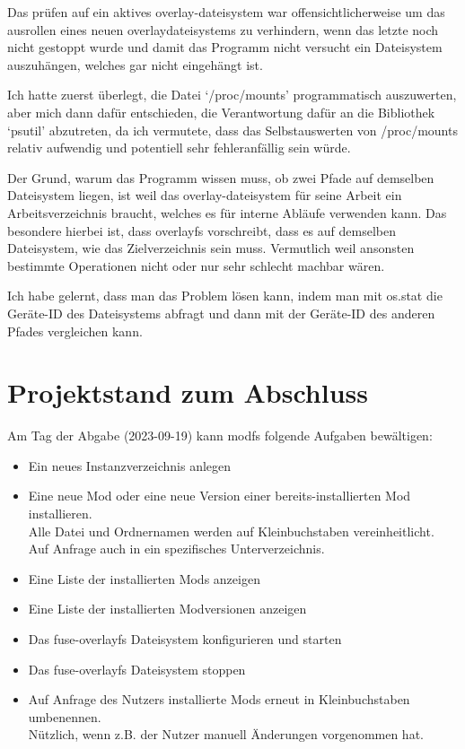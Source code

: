 \documentclass[a4paper,numbers=withenddot,11pt]{scrartcl}
\begin{document}
Das prüfen auf ein aktives overlay-dateisystem war offensichtlicherweise
um das ausrollen eines neuen overlaydateisystems zu verhindern, wenn das letzte noch
nicht gestoppt wurde und damit das Programm nicht versucht ein Dateisystem auszuhängen,
welches gar nicht eingehängt ist.

Ich hatte zuerst überlegt, die Datei `/proc/mounts' programmatisch
auszuwerten, aber mich dann dafür entschieden, die Verantwortung dafür
an die Bibliothek `psutil' abzutreten, da ich vermutete, dass das
Selbstauswerten von /proc/mounts relativ aufwendig und potentiell sehr
fehleranfällig sein würde.

Der Grund, warum das Programm wissen muss, ob zwei Pfade auf demselben Dateisystem liegen,
ist weil das overlay-dateisystem für seine Arbeit ein Arbeitsverzeichnis braucht,
welches es für interne Abläufe verwenden kann.
Das besondere hierbei ist, dass overlayfs vorschreibt, dass es auf demselben Dateisystem,
wie das Zielverzeichnis sein muss. Vermutlich weil ansonsten bestimmte Operationen
nicht oder nur sehr schlecht machbar wären.

Ich habe gelernt, dass man das Problem lösen kann, indem man mit os.stat
die Geräte-ID des Dateisystems abfragt und dann mit der Geräte-ID des anderen
Pfades vergleichen kann.

\section{Projektstand zum Abschluss}

Am Tag der Abgabe (2023-09-19) kann modfs folgende Aufgaben bewältigen:

\begin{itemize}
  \item Ein neues Instanzverzeichnis anlegen
  \item Eine neue Mod oder eine neue Version einer bereits-installierten Mod installieren.\\
        Alle Datei und Ordnernamen werden auf Kleinbuchstaben vereinheitlicht.\\
        Auf Anfrage auch in ein spezifisches Unterverzeichnis.
  \item Eine Liste der installierten Mods anzeigen
  \item Eine Liste der installierten Modversionen anzeigen
  \item Das fuse-overlayfs Dateisystem konfigurieren und starten
  \item Das fuse-overlayfs Dateisystem stoppen
  \item Auf Anfrage des Nutzers installierte Mods erneut in Kleinbuchstaben umbenennen.\\
        Nützlich, wenn z.B. der Nutzer manuell Änderungen vorgenommen hat.
\end{itemize}
\end{document}
